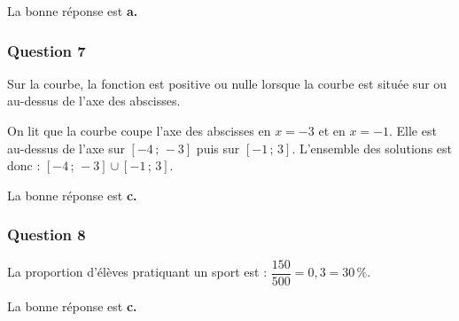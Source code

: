 La bonne réponse est \textbf{a.}

\subsubsection*{Question 7}
Sur la courbe, la fonction est positive ou nulle lorsque la courbe est située sur ou au-dessus de l'axe des abscisses.

On lit que la courbe coupe l'axe des abscisses en $x=-3$ et en $x=-1$. Elle est au-dessus de l'axe sur $[-4\,;\,-3]$ puis sur $[-1\,;\,3]$. L'ensemble des solutions est donc : $[-4\,;\,-3]\cup[-1\,;\,3]$.

La bonne réponse est \textbf{c.}

\subsubsection*{Question 8}
La proportion d'élèves pratiquant un sport est : $\dfrac{150}{500}=0{,}3=30\,\%$.

La bonne réponse est \textbf{c.}




\begin{center}
\end{center}
